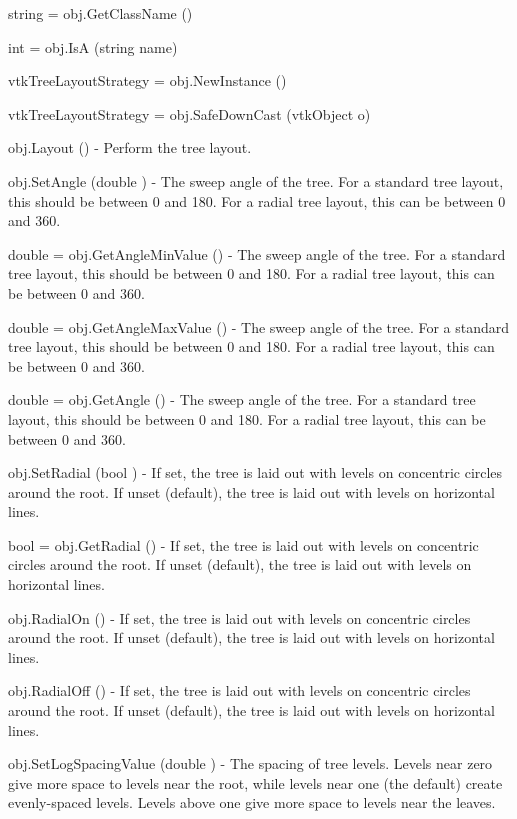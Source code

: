 \begin{DoxyItemize}
\item {\ttfamily string = obj.\-Get\-Class\-Name ()}  
\item {\ttfamily int = obj.\-Is\-A (string name)}  
\item {\ttfamily vtk\-Tree\-Layout\-Strategy = obj.\-New\-Instance ()}  
\item {\ttfamily vtk\-Tree\-Layout\-Strategy = obj.\-Safe\-Down\-Cast (vtk\-Object o)}  
\item {\ttfamily obj.\-Layout ()} -\/ Perform the tree layout.  
\item {\ttfamily obj.\-Set\-Angle (double )} -\/ The sweep angle of the tree. For a standard tree layout, this should be between 0 and 180. For a radial tree layout, this can be between 0 and 360.  
\item {\ttfamily double = obj.\-Get\-Angle\-Min\-Value ()} -\/ The sweep angle of the tree. For a standard tree layout, this should be between 0 and 180. For a radial tree layout, this can be between 0 and 360.  
\item {\ttfamily double = obj.\-Get\-Angle\-Max\-Value ()} -\/ The sweep angle of the tree. For a standard tree layout, this should be between 0 and 180. For a radial tree layout, this can be between 0 and 360.  
\item {\ttfamily double = obj.\-Get\-Angle ()} -\/ The sweep angle of the tree. For a standard tree layout, this should be between 0 and 180. For a radial tree layout, this can be between 0 and 360.  
\item {\ttfamily obj.\-Set\-Radial (bool )} -\/ If set, the tree is laid out with levels on concentric circles around the root. If unset (default), the tree is laid out with levels on horizontal lines.  
\item {\ttfamily bool = obj.\-Get\-Radial ()} -\/ If set, the tree is laid out with levels on concentric circles around the root. If unset (default), the tree is laid out with levels on horizontal lines.  
\item {\ttfamily obj.\-Radial\-On ()} -\/ If set, the tree is laid out with levels on concentric circles around the root. If unset (default), the tree is laid out with levels on horizontal lines.  
\item {\ttfamily obj.\-Radial\-Off ()} -\/ If set, the tree is laid out with levels on concentric circles around the root. If unset (default), the tree is laid out with levels on horizontal lines.  
\item {\ttfamily obj.\-Set\-Log\-Spacing\-Value (double )} -\/ The spacing of tree levels. Levels near zero give more space to levels near the root, while levels near one (the default) create evenly-\/spaced levels. Levels above one give more space to levels near the leaves.  

\end{DoxyItemize}
